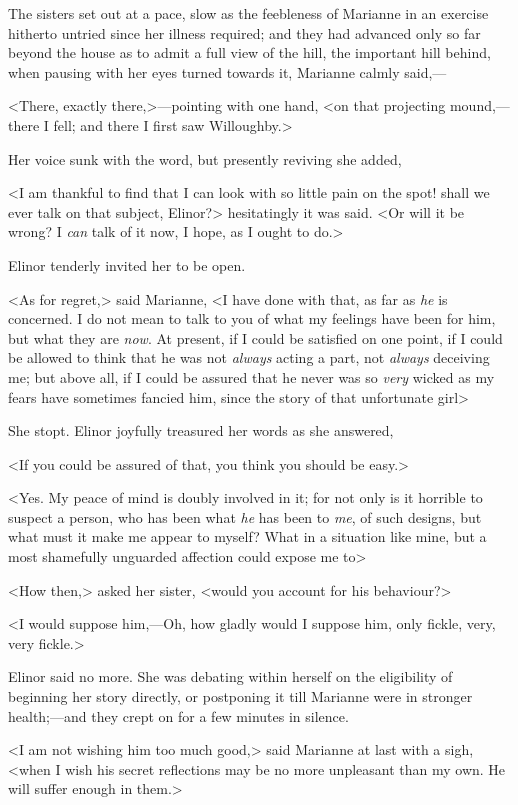The sisters set out at a pace, slow as the feebleness of Marianne in an exercise hitherto untried since her illness required; and they had advanced only so far beyond the house as to admit a full view of the hill, the important hill behind, when pausing with her eyes turned towards it, Marianne calmly said,—

<There, exactly there,>—pointing with one hand, <on that projecting mound,—there I fell; and there I first saw Willoughby.>

Her voice sunk with the word, but presently reviving she added,

<I am thankful to find that I can look with so little pain on the spot! shall we ever talk on that subject, Elinor?> hesitatingly it was said. <Or will it be wrong? I \textit{can} talk of it now, I hope, as I ought to do.>

Elinor tenderly invited her to be open.

<As for regret,> said Marianne, <I have done with that, as far as \textit{he} is concerned. I do not mean to talk to you of what my feelings have been for him, but what they are \textit{now}. At present, if I could be satisfied on one point, if I could be allowed to think that he was not \textit{always} acting a part, not \textit{always} deceiving me; but above all, if I could be assured that he never was so \textit{very} wicked as my fears have sometimes fancied him, since the story of that unfortunate girl\longdash>

She stopt. Elinor joyfully treasured her words as she answered,

<If you could be assured of that, you think you should be easy.>

<Yes. My peace of mind is doubly involved in it; for not only is it horrible to suspect a person, who has been what \textit{he} has been to \textit{me}, of such designs, but what must it make me appear to myself? What in a situation like mine, but a most shamefully unguarded affection could expose me to\longdash>

<How then,> asked her sister, <would you account for his behaviour?>

<I would suppose him,—Oh, how gladly would I suppose him, only fickle, very, very fickle.>

Elinor said no more. She was debating within herself on the eligibility of beginning her story directly, or postponing it till Marianne were in stronger health;—and they crept on for a few minutes in silence.

<I am not wishing him too much good,> said Marianne at last with a sigh, <when I wish his secret reflections may be no more unpleasant than my own. He will suffer enough in them.>

